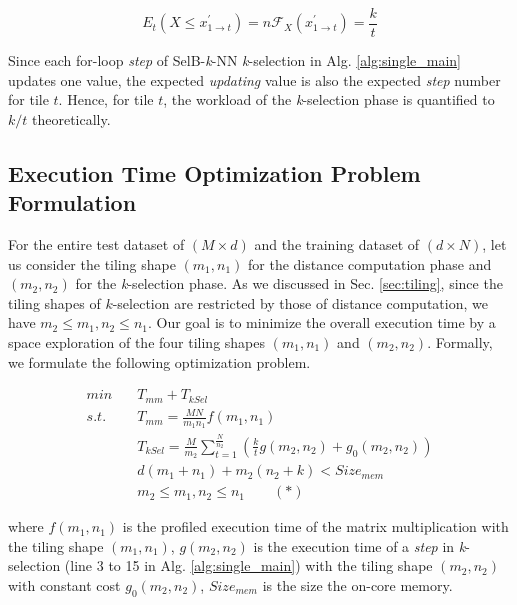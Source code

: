 \begin{equation}
    E_{t}(X \le x^{\prime}_{1 \to t}) = n \mathcal{F}_{X}(x^{\prime}_{1 \to t}) = \frac{k}{t}
\end{equation}


Since each for-loop \textit{step} of SelB-\textit{k}-NN \textit{k}-selection in Alg. \ref{alg:single_main} updates one value, the expected \textit{updating} value is also the expected \textit{step} number for tile $t$. Hence, for tile $t$, the workload of the \textit{k}-selection phase is quantified to $k / t$ theoretically.

\subsection{Execution Time Optimization Problem Formulation}

For the entire test dataset of $(M \times d)$ and the training dataset of $(d \times N)$, let us consider the tiling shape $(m_{1}, n_{1})$ for the distance computation phase and $(m_{2}, n_{2})$ for the \textit{k}-selection phase. As we discussed in Sec. \ref{sec:tiling}, since the tiling shapes of $k$-selection are restricted by those of distance computation, we have $m_{2} \le m_{1}, n_{2} \le n_{1}$. Our goal is to minimize the overall execution time by a space exploration of the four tiling shapes $(m_{1}, n_{1})$ and $(m_{2}, n_{2})$. Formally, we formulate the following optimization problem.

\begin{equation}
    \label{eq:optimized}
    \begin{aligned}
        min\quad  &T_{mm} + T_{kSel} \\
        s.t.\quad &T_{mm} = \frac{MN}{m_{1}n_{1}} f(m_{1}, n_{1}) \\
                  &T_{kSel} = \frac{M}{m_{2}} \sum_{t=1}^{\frac{N}{n_{2}}}(\frac{k}{t}g(m_{2}, n_{2}) + g_{0}(m_{2}, n_{2})) \\
                  &d(m_1 + n_1) + m_2(n_2 + k) < Size_{mem} \\
                  &m_{2} \le m_{1}, n_{2} \le n_{1} \quad \quad (*)
    \end{aligned}
\end{equation}

where $f(m_{1}, n_{1})$ is the profiled execution time of the matrix multiplication with the tiling shape $(m_{1}, n_{1})$, $g(m_{2}, n_{2})$ is the execution time of a \textit{step} in \textit{k}-selection (line 3 to 15 in Alg. \ref{alg:single_main}) with the tiling shape $(m_{2}, n_{2})$ with constant cost $g_{0}(m_{2}, n_{2})$, $Size_{mem}$ is the size the on-core memory.

